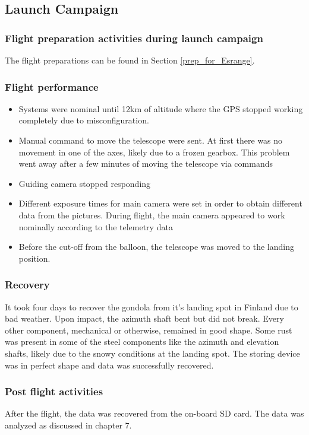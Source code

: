 \pagebreak
\subsection{Launch Campaign}
\subsubsection{Flight preparation activities during launch campaign} %
The flight preparations can be found in Section \ref{prep_for_Esrange}.

\subsubsection{Flight performance}
\begin{itemize}
	\item Systems were nominal until 12km of altitude where the GPS stopped working completely due to misconfiguration. 
	\item Manual command to move the telescope were sent. At first there was no movement in one of the axes, likely due to a frozen gearbox. This problem went away after a few minutes of moving the telescope via commands
	\item Guiding camera stopped responding
	\item Different exposure times for main camera were set in order to obtain different data from the pictures. During flight, the main camera appeared to work nominally according to the telemetry data
	\item Before the cut-off from the balloon,  the telescope was moved to the landing position.
\end{itemize} %

\subsubsection{Recovery}
It took four days to recover the gondola from it's landing spot in Finland due to bad weather. Upon impact, the azimuth shaft bent but did not break. Every other component, mechanical or otherwise, remained in good shape. Some rust was present in some of the steel components like the azimuth and elevation shafts, likely due to the snowy conditions at the landing spot. The storing device was in perfect shape and data was successfully recovered.

\subsubsection{Post flight activities}
After the flight, the data was recovered from the on-board SD card. The data was analyzed as discussed in chapter 7.%

